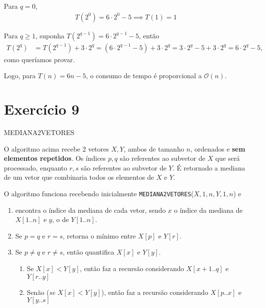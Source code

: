 \documentclass{article}
\newcommand{\bigO}[1]{\ensuremath{\mathcal{O}(#1)}}
\begin{document}
Para $q=0$,
\begin{align*}
  T(2^0) = 6 \cdot 2^0 - 5 \implies T(1) = 1
\end{align*}

Para $q \geq 1$, suponha $T(2^{q-1}) = 6 \cdot 2^{q-1} - 5$, então
\begin{align*}
  T(2^q) &= T(2^{q-1}) + 3 \cdot 2^q
  = (6 \cdot 2^{q-1} - 5) + 3 \cdot 2^q
  = 3 \cdot 2^q - 5 + 3 \cdot 2^q
  = 6 \cdot 2^q - 5 ,
\end{align*}
como queríamos provar.

Logo, para $T(n) = 6n - 5$, o consumo de tempo é proporcional a \bigO{n}.

\newpage

\section*{Exercício 9}

\begin{algorithm}
  \DontPrintSemicolon
  \caption{MEDIANA2VETORES}
\end{algorithm}

O algoritmo acima recebe 2 vetores $X,Y$, ambos de tamanho $n$, ordenados e \textbf{sem elementos repetidos}.
Os índices $p,q$ são referentes ao subvetor de $X$ que será processado, enquanto $r,s$ são referentes ao subvetor de $Y$.
É retornado a mediana de um vetor que combinaria todos os elementos de $X$ e $Y$.

O algoritmo funciona recebendo inicialmente \texttt{MEDIANA2VETORES}($X,1,n,Y,1,n$) e
\begin{enumerate}
  \item encontra o índice da mediana de cada vetor, sendo $x$ o índice da mediana de $X[1..n]$ e $y$, o de $Y[1..n]$.
  \item Se $p = q$ e $r = s$, retorna o mínimo entre $X[p]$ e $Y[r]$.
  \item Se $p \neq q$ e $r \neq s$, então quantifica $X[x]$ e $Y[y]$.
  \begin{enumerate}
    \item Se $X[x] < Y[y]$, então faz a recursão considerando $X[x+1..q]$ e $Y[r..y]$
    \item Senão (\textit{se $X[x] < Y[y]$}), então faz a recursão considerando $X[p..x]$ e $Y[y..s]$
  \end{enumerate}
\end{enumerate}
\end{document}
